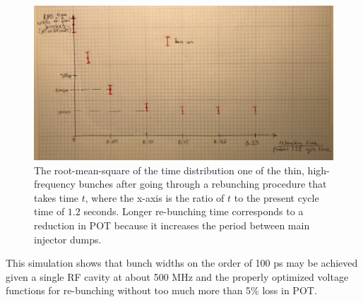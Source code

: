 \begin{figure}[t]
	\begin{center}
        \includegraphics[width=0.60\linewidth]{Figures/draft_rms_vs_time.JPG}
	\end{center}
	\caption{The root-mean-square of the time distribution one of
          the thin, high-frequency bunches after going through a
          rebunching procedure that takes time $t$, where the x-axis
          is the ratio of $t$ to the present cycle time of $1.2$
          seconds. Longer re-bunching time corresponds to a reduction
          in POT because it increases the period between main injector
          dumps.}
		\label{fig:bunch_width_curve}
\end{figure}

This simulation shows that bunch widths on the order of 100 ps may be
achieved given a single RF cavity at about 500 MHz and the properly
optimized voltage functions for re-bunching without too much more than
5\% loss in POT.

